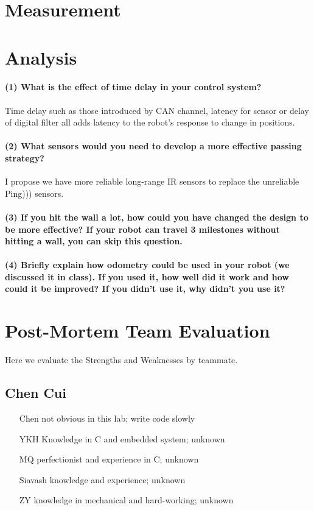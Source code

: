 \documentclass[a4paper]{article}
\begin{document}
\section{Measurement}

\section{Analysis}
\paragraph{(1) What is the effect of time delay in your control system? }
Time delay such as those introduced by CAN channel, latency for sensor or delay of digital filter all adds latency
to the robot's response to change in positions.

\paragraph{(2) What sensors would you need to develop a more effective passing strategy? }
I propose we have more reliable long-range IR sensors to replace the unreliable Ping))) sensors.

\paragraph{(3) If you hit the wall a lot, how could you have changed the design to be more effective? If your robot can 
travel 3 milestones without hitting a wall, you can skip this question. }

\paragraph{(4) Briefly explain how odometry could be used in your robot (we discussed it in class). If you used it, how 
well did it work and how could it be improved? If you didn’t use it, why didn’t you use it?}


\section{Post-Mortem Team Evaluation}
Here we evaluate the Strengths and Weaknesses by teammate.

\subsection{Chen Cui}
\begin{itemize}
\item[Chen] not obvious in this lab; write code slowly
\item[YKH] Knowledge in C and embedded system; unknown
\item[MQ] perfectionist and experience in C; unknown
\item[Siavash] knowledge and experience; unknown
\item[ZY] knowledge in mechanical and hard-working; unknown
\end{itemize}
\end{document}
